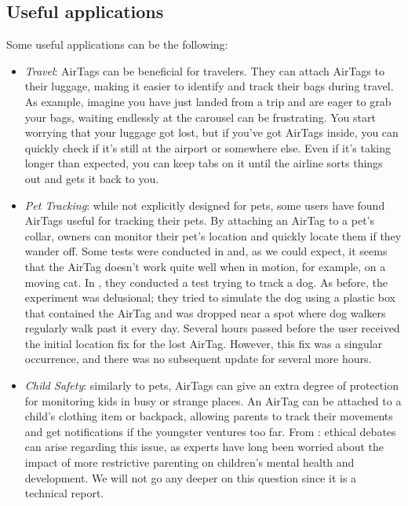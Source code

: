 \documentclass[english]{article}
\begin{document}
\subsection{Useful applications}\label{appl}
Some useful applications can be the following:
\begin{itemize}
  \item \textit{Travel}: AirTags can be beneficial for travelers. They can attach AirTags to their luggage, making it easier to identify and track their bags during travel. As example, 
  imagine you have just landed from a trip and are eager to grab your bags, waiting endlessly at the carousel can be frustrating. You start worrying that your luggage got lost, but if you've got AirTags inside, you can quickly check if it's still at the airport or somewhere else. Even if it's taking longer than expected, you can keep tabs on it until the airline sorts things out and gets it back to you.
  \item \textit{Pet Tracking}: while not explicitly designed for pets, some users have found AirTags useful for tracking their pets. By attaching an AirTag to a pet's collar, owners can monitor their pet's location and quickly locate them if they wander off. Some tests were conducted in \cite{KittyCatGO2024} and, as we could expect, it seems that the AirTag doesn’t work quite well when in motion, for example, on a moving cat. In \cite{Src2024}, they conducted a test trying to track a dog. As before, the experiment was delusional; they tried to simulate the dog using a plastic box that contained the AirTag and was dropped near a spot where dog walkers regularly walk past it every day. Several hours passed before the user received the initial location fix for the lost AirTag. However, this fix was a singular occurrence, and there was no subsequent update for several more hours.
  \item \textit{Child Safety}: similarly to pets, AirTags can give an extra degree of protection for monitoring kids in busy or strange places. An AirTag can be attached to a child's clothing item or backpack, allowing parents to track their movements and get notifications if the youngster ventures too far. From \cite{Kelly_2023}: ethical debates can arise regarding this issue, as experts have long been worried about the impact of more restrictive parenting on children’s mental health and development. We will not go any deeper on this question since it is a technical report.

\end{itemize}
\end{document}
